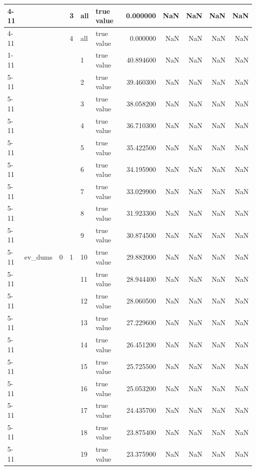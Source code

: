 \begin{tabular}{llllllrrrrr}
\cline{4-11} \cline{5-11}
 &  &  & 3 & all & true value & 0.000000 & NaN & NaN & NaN & NaN \\
\cline{4-11} \cline{5-11}
 &  &  & 4 & all & true value & 0.000000 & NaN & NaN & NaN & NaN \\
\cline{1-11} \cline{2-11} \cline{3-11} \cline{4-11} \cline{5-11}
\multirow[t]{202}{*}{ev} & \multirow[t]{202}{*}{ev_dums} & \multirow[t]{101}{*}{0} & \multirow[t]{25}{*}{1} & 1 & true value & 40.894600 & NaN & NaN & NaN & NaN \\
\cline{5-11}
 &  &  &  & 2 & true value & 39.460300 & NaN & NaN & NaN & NaN \\
\cline{5-11}
 &  &  &  & 3 & true value & 38.058200 & NaN & NaN & NaN & NaN \\
\cline{5-11}
 &  &  &  & 4 & true value & 36.710300 & NaN & NaN & NaN & NaN \\
\cline{5-11}
 &  &  &  & 5 & true value & 35.422500 & NaN & NaN & NaN & NaN \\
\cline{5-11}
 &  &  &  & 6 & true value & 34.195900 & NaN & NaN & NaN & NaN \\
\cline{5-11}
 &  &  &  & 7 & true value & 33.029900 & NaN & NaN & NaN & NaN \\
\cline{5-11}
 &  &  &  & 8 & true value & 31.923300 & NaN & NaN & NaN & NaN \\
\cline{5-11}
 &  &  &  & 9 & true value & 30.874500 & NaN & NaN & NaN & NaN \\
\cline{5-11}
 &  &  &  & 10 & true value & 29.882000 & NaN & NaN & NaN & NaN \\
\cline{5-11}
 &  &  &  & 11 & true value & 28.944400 & NaN & NaN & NaN & NaN \\
\cline{5-11}
 &  &  &  & 12 & true value & 28.060500 & NaN & NaN & NaN & NaN \\
\cline{5-11}
 &  &  &  & 13 & true value & 27.229600 & NaN & NaN & NaN & NaN \\
\cline{5-11}
 &  &  &  & 14 & true value & 26.451200 & NaN & NaN & NaN & NaN \\
\cline{5-11}
 &  &  &  & 15 & true value & 25.725500 & NaN & NaN & NaN & NaN \\
\cline{5-11}
 &  &  &  & 16 & true value & 25.053200 & NaN & NaN & NaN & NaN \\
\cline{5-11}
 &  &  &  & 17 & true value & 24.435700 & NaN & NaN & NaN & NaN \\
\cline{5-11}
 &  &  &  & 18 & true value & 23.875400 & NaN & NaN & NaN & NaN \\
\cline{5-11}
 &  &  &  & 19 & true value & 23.375900 & NaN & NaN & NaN & NaN \\

\end{tabular}
